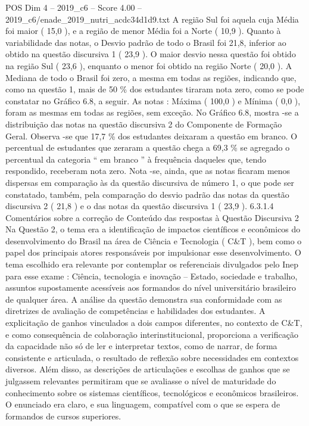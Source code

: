 \begin{textsample}{POS Dim 4 – 2019\_c6 – Score 4.00 – 2019\_c6/enade\_2019\_nutri\_acdc34d1d9.txt}
A região Sul foi aquela cuja Média foi maior ( 15,0 ), e a região de menor Média foi a Norte ( 10,9 ).
Quanto à variabilidade das notas, o Desvio padrão de todo o Brasil foi 21,8, inferior ao obtido na questão discursiva 1 ( 23,9 ).
O maior desvio nessa questão foi obtido na região Sul ( 23,6 ), enquanto o menor foi obtido na região Norte ( 20,0 ).
A Mediana de todo o Brasil foi zero, a mesma em todas as regiões, indicando que, como na questão 1, mais de 50 \% dos estudantes tiraram nota zero, como se pode constatar no Gráfico 6.8, a seguir.
As notas : Máxima ( 100,0 ) e Mínima ( 0,0 ), foram as mesmas em todas as regiões, sem exceção.
No Gráfico 6.8, mostra -se a distribuição das notas na questão discursiva 2 do Componente de Formação Geral.
Observa -se que 17,7 \% dos estudantes deixaram a questão em branco.
O percentual de estudantes que zeraram a questão chega a 69,3 \% se agregado o percentual da categoria “ em branco ” à frequência daqueles que, tendo respondido, receberam nota zero.
Nota -se, ainda, que as notas ficaram menos dispersas em comparação às da questão discursiva de número 1, o que pode ser constatado, também, pela comparação do desvio padrão das notas da questão discursiva 2 ( 21,8 ) e o das notas da questão discursiva 1 ( 23,9 ). 6.3.1.4 Comentários sobre a correção de Conteúdo das respostas à Questão Discursiva 2 Na Questão 2, o tema era a identificação de impactos científicos e econômicos do desenvolvimento do Brasil na área de Ciência e Tecnologia ( C\&T ), bem como o papel dos principais atores responsáveis por impulsionar esse desenvolvimento.
O tema escolhido era relevante por contemplar os referenciais divulgados pelo Inep para esse exame : Ciência, tecnologia e inovação – Estado, sociedade e trabalho, assuntos supostamente acessíveis aos formandos do nível universitário brasileiro de qualquer área.
A análise da questão demonstra sua conformidade com as diretrizes de avaliação de competências e habilidades dos estudantes.
A explicitação de ganhos vinculados a dois campos diferentes, no contexto de C\&T, e como consequência de colaboração interinstitucional, proporciona a verificação da capacidade não só de ler e interpretar textos, como de narrar, de forma consistente e articulada, o resultado de reflexão sobre necessidades em contextos diversos.
Além disso, as descrições de articulações e escolhas de ganhos que se julgassem relevantes permitiram que se avaliasse o nível de maturidade do conhecimento sobre os sistemas científicos, tecnológicos e econômicos brasileiros.
O enunciado era claro, e sua linguagem, compatível com o que se espera de formandos de cursos superiores.

\end{textsample}
